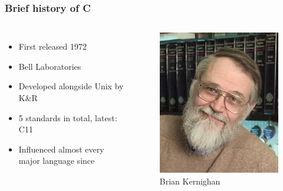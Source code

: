 \documentclass{beamer}
\begin{document}
\begin{frame}
    \frametitle{Brief history of C}
    \begin{columns}

        \begin{itemize}[<+->]
            \item First released 1972
            \item Bell Laboratories
            \item Developed alongside Unix by K\&R
            \item 5 standards in total, latest: C11
            \item Influenced almost every major language since
        \end{itemize}


        \begin{figure}
            \centering
            \includegraphics[width=\textwidth]{briankernighan.jpg}
            \caption*{Brian Kernighan}
            \label{fig:kern}
        \end{figure}


\end{columns}
\end{frame}
\end{document}

